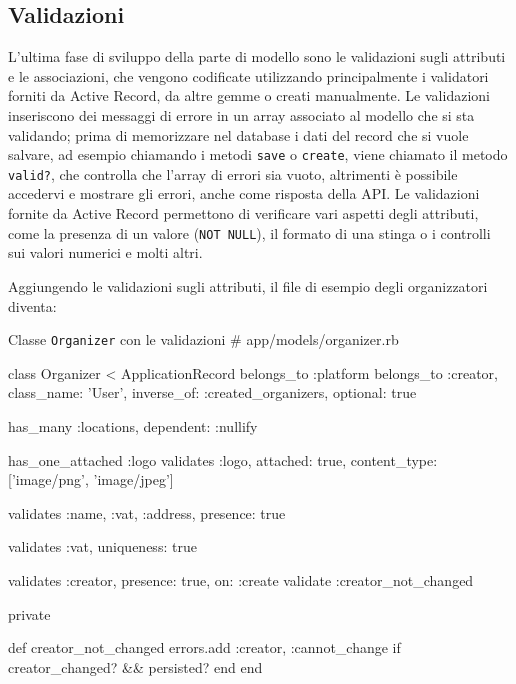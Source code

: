 \subsection{Validazioni} \label{code:validates}
L'ultima fase di sviluppo della parte di modello sono le validazioni sugli attributi e le associazioni, che vengono codificate utilizzando principalmente i validatori forniti da Active Record, da altre gemme o creati manualmente. Le validazioni inseriscono dei messaggi di errore in un array associato al modello che si sta validando; prima di memorizzare nel database i dati del record che si vuole salvare, ad esempio chiamando i metodi \verb|save| o \verb|create|, viene chiamato il metodo \verb|valid?|, che controlla che l'array di errori sia vuoto, altrimenti è possibile accedervi e mostrare gli errori, anche come risposta della API. Le validazioni fornite da Active Record permettono di verificare vari aspetti degli attributi, come la presenza di un valore (\verb|NOT NULL|), il formato di una stinga o i controlli sui valori numerici e molti altri.

Aggiungendo le validazioni sugli attributi, il file di esempio degli organizzatori diventa:

\begin{code}{Classe \texttt{Organizer} con le validazioni}
# app/models/organizer.rb

class Organizer < ApplicationRecord
  belongs_to :platform
  belongs_to :creator, class_name: 'User', inverse_of: :created_organizers, optional: true

  has_many :locations, dependent: :nullify

  has_one_attached :logo
  validates :logo, attached: true, content_type: ['image/png', 'image/jpeg']

  validates :name,
            :vat,
            :address,
            presence: true

  validates :vat, uniqueness: true

  validates :creator, presence: true, on: :create
  validate :creator_not_changed

private

  def creator_not_changed
    errors.add :creator, :cannot_change if creator_changed? && persisted?
  end
end
\end{code}

